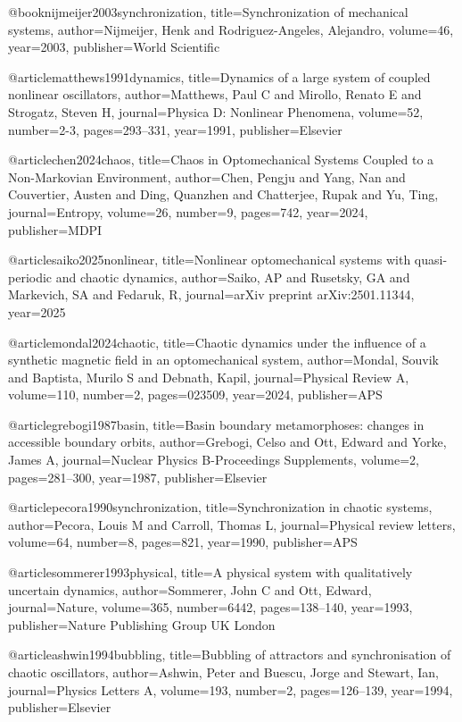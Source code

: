 @book{nijmeijer2003synchronization,
  title={Synchronization of mechanical systems},
  author={Nijmeijer, Henk and Rodriguez-Angeles, Alejandro},
  volume={46},
  year={2003},
  publisher={World Scientific}
}

@article{matthews1991dynamics,
  title={Dynamics of a large system of coupled nonlinear oscillators},
  author={Matthews, Paul C and Mirollo, Renato E and Strogatz, Steven H},
  journal={Physica D: Nonlinear Phenomena},
  volume={52},
  number={2-3},
  pages={293--331},
  year={1991},
  publisher={Elsevier}
}

@article{chen2024chaos,
  title={Chaos in Optomechanical Systems Coupled to a Non-Markovian Environment},
  author={Chen, Pengju and Yang, Nan and Couvertier, Austen and Ding, Quanzhen and Chatterjee, Rupak and Yu, Ting},
  journal={Entropy},
  volume={26},
  number={9},
  pages={742},
  year={2024},
  publisher={MDPI}
}

@article{saiko2025nonlinear,
  title={Nonlinear optomechanical systems with quasi-periodic and chaotic dynamics},
  author={Saiko, AP and Rusetsky, GA and Markevich, SA and Fedaruk, R},
  journal={arXiv preprint arXiv:2501.11344},
  year={2025}
}

@article{mondal2024chaotic,
  title={Chaotic dynamics under the influence of a synthetic magnetic field in an optomechanical system},
  author={Mondal, Souvik and Baptista, Murilo S and Debnath, Kapil},
  journal={Physical Review A},
  volume={110},
  number={2},
  pages={023509},
  year={2024},
  publisher={APS}
}

@article{grebogi1987basin,
  title={Basin boundary metamorphoses: changes in accessible boundary orbits},
  author={Grebogi, Celso and Ott, Edward and Yorke, James A},
  journal={Nuclear Physics B-Proceedings Supplements},
  volume={2},
  pages={281--300},
  year={1987},
  publisher={Elsevier}
}


@article{pecora1990synchronization,
  title={Synchronization in chaotic systems},
  author={Pecora, Louis M and Carroll, Thomas L},
  journal={Physical review letters},
  volume={64},
  number={8},
  pages={821},
  year={1990},
  publisher={APS}
}

@article{sommerer1993physical,
  title={A physical system with qualitatively uncertain dynamics},
  author={Sommerer, John C and Ott, Edward},
  journal={Nature},
  volume={365},
  number={6442},
  pages={138--140},
  year={1993},
  publisher={Nature Publishing Group UK London}
}

@article{ashwin1994bubbling,
  title={Bubbling of attractors and synchronisation of chaotic oscillators},
  author={Ashwin, Peter and Buescu, Jorge and Stewart, Ian},
  journal={Physics Letters A},
  volume={193},
  number={2},
  pages={126--139},
  year={1994},
  publisher={Elsevier}
}

